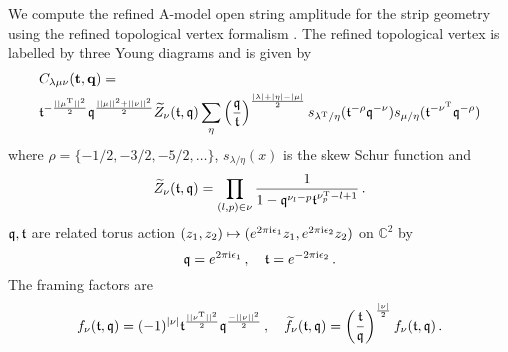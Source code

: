 \documentclass[main.tex]{subfiles}
\begin{document}
We compute the refined A-model open string amplitude for the strip geometry using the refined topological vertex formalism \cite{Aganagic:2003db,Iqbal:2007ii}.
The refined topological vertex is labelled by three Young diagrams and is given by
\begin{equation}
\begin{aligned}
&C_{\lambda\mu\nu}(\mathbf{t},\mathbf{q})=\\
&\mathfrak{t}^{-\frac{||\mu^{\operatorname{T}}||^2}{2}}\mathfrak{q}^{\frac{||\mu||^2+||\nu||^2}{2}}\widetilde{Z}_{\nu}(\mathfrak{t},\mathfrak{q})\sum_{\eta}\left(\frac{\mathfrak{q}}{\mathfrak{t}}\right)^{\frac{|\lambda|+|\eta|-|\mu|}{2}}s_{\lambda^{\operatorname{T}}/\eta}(\mathfrak{t}^{-\rho}\mathfrak{q}^{-\nu})s_{\mu/\eta}(\mathfrak{t}^{-\nu^{\operatorname{T}}}\mathfrak{q}^{-\rho})
\end{aligned}
\end{equation}
where $\rho=\{-1/2,-3/2,-5/2,\dots\}$, $s_{\lambda/\eta}(x)$ is the skew Schur function and 
\begin{equation}
\widetilde{Z}_{\nu}(\mathfrak{t},\mathfrak{q})=\prod_{(l,p)\in\nu}\frac{1}{1-\mathfrak{q}^{\nu_l-p}\mathfrak{t}^{\nu_p^{\operatorname{T}}-l+1}}\,.
\end{equation} 
$\mathfrak{q},\mathfrak{t}$ are related torus action $(z_1,z_2)\mapsto (e^{2\pi\mathrm{i}\epsilon_1}z_1,e^{2\pi\mathrm{i}\epsilon_2}z_2)$ on $\mathbb{C}^2$ by
\begin{equation}
\mathfrak{q}=e^{2\pi\mathrm{i}\epsilon_1}\,,\quad \mathfrak{t}=e^{-2\pi\mathrm{i}\epsilon_2}\,.
\end{equation}
The framing factors are
\begin{equation}
f_{\nu}(\mathfrak{t},\mathfrak{q})=(-1)^{|\nu|}\mathfrak{t}^{\frac{||\nu^{\operatorname{T}}||^2}{2}}\mathfrak{q}^{\frac{-||\nu||^2}{2}}\,,\quad \widetilde{f}_{\nu}(\mathfrak{t},\mathfrak{q})=\left(\frac{\mathfrak{t}}{\mathfrak{q}}\right)^{\frac{|\nu|}{2}}f_{\nu}(\mathfrak{t},\mathfrak{q})\,.
\end{equation}
\end{document}
